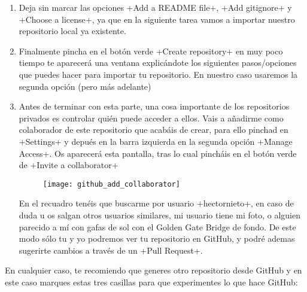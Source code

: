 \documentclass[a5paper,10pt]{article}
\begin{document}
\begin{enumerate}
       \item Deja sin marcar las opciones \cverb+Add a README file+, \cverb+Add gitignore+ y \cverb+Choose a license+, ya que en la siguiente tarea vamos a importar nuestro repositorio local ya existente.
       
       \item Finalmente pincha en el botón verde \cverb+Create repository+ en muy poco tiempo te aparecerá una ventana explicándote los siguientes pasos/opciones que puedes hacer para importar tu repositorio. En nuestro caso usaremos la segunda opción (pero más adelante)
       
       \item Antes de terminar con esta parte, una cosa importante de los repositorios privados es controlar quién puede acceder a ellos. Vais a añadirme como colaborador de este repositorio que acabáis de crear, para ello pinchad en \cverb+Settings+ y depués en la barra izquierda en la segunda opción \cverb+Manage Access+. Os aparecerá esta pantalla, tras lo cual pincháis en el botón verde de \cverb+Invite a collaborator+

       \begin{figure}[H]\centering
        \hspace{-1cm}\texttt{[image: github\_add\_collaborator]}
       \end{figure}
       
       En el recuadro tenéis que buscarme por usuario \cverb+hectornieto+, en caso de duda u os salgan otros usuarios similares, mi usuario tiene mi foto, o alguien parecido a mí con gafas de sol con el Golden Gate Bridge de fondo. De este modo sólo tu y yo podremos ver tu repositorio en GitHub, y podré ademas sugerirte cambios a través de un \cverb+Pull Request+.
      \end{enumerate}
       
       En cualquier caso, te recomiendo que generes otro repositorio desde GitHub y en este caso marques estas tres casillas para que experimentes lo que hace GitHub:
       
\end{document}
